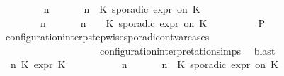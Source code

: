 \begin{isabellebody}
\ \ \ \ \ \ \isamarkupfalse%
\ {\isacartoucheopen}{\isacharparenleft}{\isasymGamma}\ n\ {\isasymturnstile}\ {\isasymPsi}\ {\isasymtriangleright}\ {\isasymPhi}\ {\isacharequal}\ {\isacharparenleft}{\isasymGamma}{\isacharcomma}\ n\ {\isasymturnstile}\ {\isacharparenleft}K\ sporadic{\isasymsharp}\ {\isasymtau}\isactrlsub e\isactrlsub x\isactrlsub p\isactrlsub r\ on\ K\ {\isacharhash}\ {\isasymPsi}\ {\isasymtriangleright}\ {\isasymPhi}{\isacharparenright}{\isacartoucheclose}\isanewline
\ \ \ \ \ \ \ {\isacartoucheopen}{\isacharparenleft}{\isasymGamma}\ n\ {\isasymturnstile}\ {\isasymPsi}\ {\isasymtriangleright}\ {\isasymPhi}\ {\isacharequal}\ {\isacharparenleft}{\isasymGamma}{\isacharcomma}\ n\ {\isasymturnstile}\ {\isasymPsi}\ {\isasymtriangleright}\ {\isacharparenleft}{\isacharparenleft}K\ sporadic{\isasymsharp}\ {\isasymtau}\isactrlsub e\isactrlsub x\isactrlsub p\isactrlsub r\ on\ K\ {\isacharhash}\ {\isasymPhi}{\isacharparenright}{\isacharparenright}{\isacartoucheclose}\isanewline
\ \ \ \ \ \ \isamarkupfalse%
\ {\isacharquery}P\ \isamarkupfalse%
\ configuration{\isacharunderscore}interp{\isacharunderscore}stepwise{\isacharunderscore}sporadicon{\isacharunderscore}tvar{\isacharunderscore}cases\isanewline
\ \ \ \ \ \ \ \ \ \ \ \ \ \ \ \ \ \ \ \ configuration{\isacharunderscore}interpretation{\isachardot}simps\ \isamarkupfalse%
\ blast\isanewline
\ \ \ \ \isamarkupfalse%
\isanewline
\ \ \ \ \ \ \isamarkupfalse%
\ {\isasymGamma}\ n\ K\ {\isasymtau}\isactrlsub e\isactrlsub x\isactrlsub p\isactrlsub r\ K\ {\isasymPsi}\ {\isasymPhi}\isanewline
\ \ \ \ \ \ \isamarkupfalse%
\ {\isacartoucheopen}{\isacharparenleft}{\isasymGamma}\ n\ {\isasymturnstile}\ {\isasymPsi}\ {\isasymtriangleright}\ {\isasymPhi}\ {\isacharequal}\ {\isacharparenleft}{\isasymGamma}{\isacharcomma}\ n\ {\isasymturnstile}\ {\isacharparenleft}K\ sporadic{\isasymsharp}\ {\isasymtau}\isactrlsub e\isactrlsub x\isactrlsub p\isactrlsub r\ on\ K\ {\isacharhash}\ {\isasymPsi}\ {\isasymtriangleright}\ {\isasymPhi}{\isacharparenright}{\isacartoucheclose}\isanewline

\end{isabellebody}
